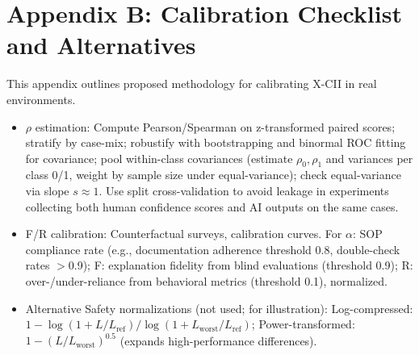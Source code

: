 \documentclass[11pt,a4paper]{article}
\begin{document}
\section{Appendix B: Calibration Checklist and Alternatives}
This appendix outlines proposed methodology for calibrating X-CII in real environments.  
\begin{itemize}
\item $\rho$ estimation: Compute Pearson/Spearman on z-transformed paired scores; stratify by case-mix; robustify with bootstrapping and binormal ROC fitting for covariance; pool within-class covariances (estimate $\rho_0, \rho_1$ and variances per class 0/1, weight by sample size under equal-variance); check equal-variance via slope $s \approx 1$. Use split cross-validation to avoid leakage in experiments collecting both human confidence scores and AI outputs on the same cases.  
\item F/R calibration: Counterfactual surveys, calibration curves. For $\alpha$: SOP compliance rate (e.g., documentation adherence threshold 0.8, double-check rates $>$0.9); F: explanation fidelity from blind evaluations (threshold 0.9); R: over-/under-reliance from behavioral metrics (threshold 0.1), normalized.  
\item Alternative Safety normalizations (not used; for illustration): Log-compressed: $1 - \log(1 + L/L_{\text{ref}})/\log(1 + L_{\text{worst}}/L_{\text{ref}})$; Power-transformed: $1 - (L/L_{\text{worst}})^{0.5}$ (expands high-performance differences).
\end{itemize}
\end{document}
